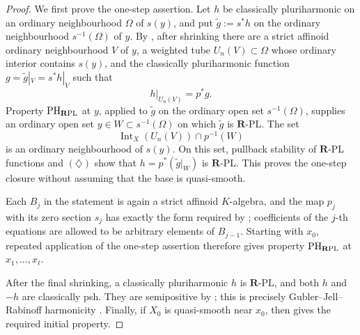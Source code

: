 \begin{proof}
We first prove the one-step assertion.  Let \(h\) be classically
pluriharmonic on an ordinary neighbourhood \(\Omega\) of \(s(y)\), and put
\(\widetilde g:=s^*h\) on the ordinary neighbourhood
\(s^{-1}(\Omega)\) of \(y\).  By
, after shrinking
there are a strict affinoid ordinary neighbourhood \(V\) of \(y\), a
weighted tube \(U_n(V)\subset\Omega\) whose ordinary interior contains
\(s(y)\), and the classically pluriharmonic function
\(g=\widetilde g|_V=s^*h|_V\) such that
\[
                         h|_{U_n(V)}=p^*g.
\tag{\(\diamondsuit\)}
\]
Property \({\rm PH}_{\mathbf R{\rm PL}}\) at \(y\), applied to
\(\widetilde g\) on the ordinary open set \(s^{-1}(\Omega)\), supplies an
ordinary open set \(y\in W\subset s^{-1}(\Omega)\) on which
\(\widetilde g\) is \(\mathbf R\)-PL.  The set
\[
       \operatorname{Int}_X(U_n(V))\cap p^{-1}(W)
\]
is an ordinary neighbourhood of \(s(y)\).  On this set, pullback stability
of \(\mathbf R\)-PL functions \cite[Lemma~5.4(1)]{GJR26} and
\((\diamondsuit)\) show that \(h=p^*(\widetilde g|_W)\) is
\(\mathbf R\)-PL.  This proves the
one-step closure without assuming that the base is quasi-smooth.

Each \(B_j\) in the statement is again a strict affinoid \(K\)-algebra, and
the map \(p_j\) with its zero section \(s_j\) has exactly the form required
by ; coefficients
of the \(j\)-th equations are allowed to be arbitrary elements of
\(B_{j-1}\).  Starting with \(x_0\), repeated application of the one-step
assertion therefore gives property \({\rm PH}_{\mathbf R{\rm PL}}\) at
\(x_1,\ldots,x_\ell\).

After the final shrinking, a classically pluriharmonic \(h\) is
\(\mathbf R\)-PL, and both \(h\) and \(-h\) are classically psh.  They are
semipositive by \cite[Theorem~4.3]{GR25Classical}; this is precisely
Gubler--Jell--Rabinoff harmonicity
\cite[Definition~7.2]{GJR26}.  Finally, if \(X_0\) is quasi-smooth near
\(x_0\), then  gives the required initial
property.
\end{proof}
